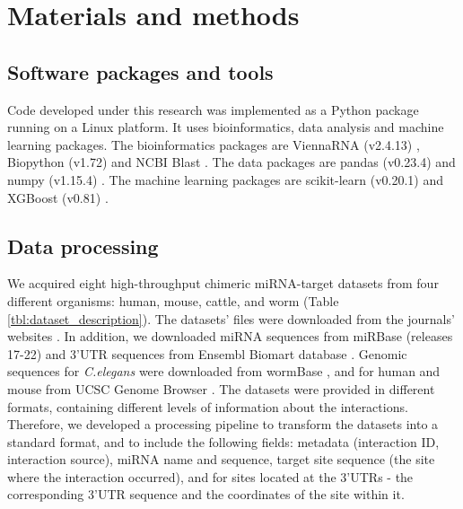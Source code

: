 \documentclass{bmcart}
\begin{document}

\clearpage
\section*{Materials and methods}
\subsection*{Software packages and tools}
Code developed under this research was implemented as a Python package running on a Linux platform. It uses bioinformatics, data analysis and machine learning packages. The bioinformatics packages are ViennaRNA (v2.4.13) \cite{lorenz2011viennarna}, Biopython (v1.72) \cite{cock2009biopython} and NCBI Blast \cite{altschul1990basic_blast}. The data packages are pandas (v0.23.4) \cite{mckinney2010data_pandas} and numpy (v1.15.4) \cite{oliphant2006guide_numpy}. The machine learning packages are scikit-learn (v0.20.1) \cite{pedregosa2011scikit} and XGBoost (v0.81) \cite{xgboost}.

\subsection*{Data processing}
We acquired eight high-throughput chimeric miRNA-target datasets from four different organisms: human, mouse, cattle, and worm (Table \ref{tbl:dataset_description}). The datasets' files were downloaded from the journals' websites \cite{scheel2017global, grosswendt2014unambiguous, broughton2016pairing, helwak2013mapping, darnell_moore2015mirna}. In addition, we downloaded miRNA sequences from miRBase (releases 17-22) \cite{kozomara2013mirbase} and 3'UTR sequences from Ensembl Biomart database \cite{smedley2015biomart}. Genomic sequences for \textit{C.elegans} were downloaded from wormBase \cite{lee2017wormbase}, and for human and mouse from UCSC Genome Browser \cite{karolchik2004ucsc}.
The datasets were provided in different formats, containing different levels of information about the interactions. Therefore, we developed a processing pipeline to transform the datasets into a standard format, and to include the following fields: metadata (interaction ID, interaction source), miRNA name and sequence, target site sequence (the site where the interaction occurred), and for sites located at the 3'UTRs - the corresponding 3'UTR sequence and the coordinates of the site within it.
\end{document}
